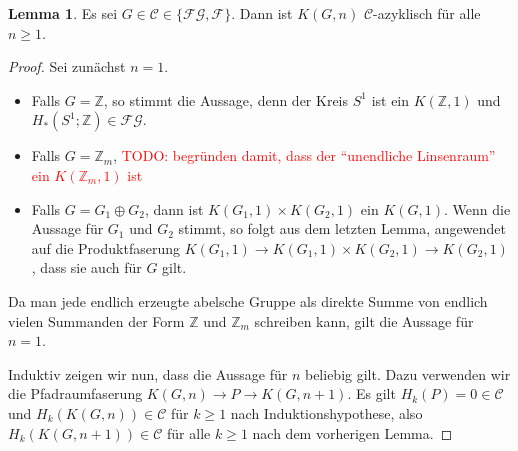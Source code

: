 \documentclass[11pt, a4paper, german]{article}
\theoremstyle{definition}
\newtheorem{lem}{Lemma}
\theoremstyle{remark}
\newcommand{\TODO}[1]{\textcolor{red}{TODO: #1}} %
\newcommand{\Z}{\mathbb{Z}} %
\newcommand{\SC}{\mathcal{C}} %
\newcommand{\FG}{\mathcal{FG}} %
\newcommand{\F}{\mathcal{F}} %
\begin{document}
\begin{lem}\label{homology-kgn-in-c}
  Es sei $G \in \SC \in \{ \FG, \F \}$.
  Dann ist $K(G, n)$ $\SC$-azyklisch für alle $n \geq 1$.
\end{lem}

\begin{proof}
  Sei zunächst $n=1$.
  \begin{itemize}
    \item Falls $G = \Z$, so stimmt die Aussage, denn der Kreis $S^1$ ist ein $K(\Z, 1)$ und $H_*(S^1; \Z) \in \FG$.
    \item Falls $G = \Z_m$, \TODO{begründen damit, dass der "`unendliche Linsenraum"' ein $K(\Z_m, 1)$ ist}
    \item Falls $G = G_1 \oplus G_2$, dann ist $K(G_1, 1) \times K(G_2, 1)$ ein $K(G, 1)$.
    Wenn die Aussage für $G_1$ und $G_2$ stimmt, so folgt aus dem letzten Lemma, angewendet auf die Produktfaserung $K(G_1, 1) \to K(G_1, 1) \times K(G_2, 1) \to K(G_2, 1)$, dass sie auch für $G$ gilt.
  \end{itemize}
  Da man jede endlich erzeugte abelsche Gruppe als direkte Summe von endlich vielen Summanden der Form $\Z$ und $\Z_m$ schreiben kann, gilt die Aussage für $n=1$.

  Induktiv zeigen wir nun, dass die Aussage für $n$ beliebig gilt.
  Dazu verwenden wir die Pfadraumfaserung $K(G, n) \to P \to K(G, n{+}1)$.
  Es gilt $H_k(P) = 0 \in \SC$ und $H_k(K(G, n)) \in \SC$ für $k \geq 1$ nach Induktionshypothese, also $H_k(K(G, n{+}1)) \in \SC$ für alle $k \geq 1$ nach dem vorherigen Lemma.
\end{proof}
\end{document}
